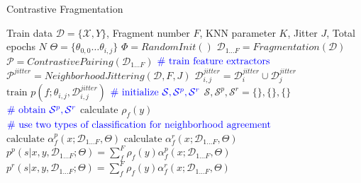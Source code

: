 \documentclass{article}
\theoremstyle{plain}
\theoremstyle{definition}
\theoremstyle{remark}
\begin{document}
    

\begin{algorithm}[tb]
\caption{Contrastive Fragmentation}\label{alg:fragmented_selection}
    \begin{algorithmic}
         Train data $\mathcal{D} = \{\mathcal{X}, Y\}$, Fragment number $F$, KNN parameter $K$, Jitter $J$, Total epochs $N$ 
        \STATE
        \STATE $\Theta = \{\theta_{0,0} \ldots \theta_{i,j}\}$ 
        \STATE $\Phi = RandomInit()$ 
        \STATE
        \STATE $\mathcal{D}_{1 \ldots F} = Fragmentation(\mathcal{D})$ 
        \STATE $\mathcal{P} = ContrastivePairing(\mathcal{D}_{1 \ldots F})$ 
            \STATE $\text{\color{blue}{\# train feature extractors}}$
            \STATE $\mathcal{P}^{jitter} = NeighborhoodJittering(\mathcal{D}, F, J)$ 
                \STATE $\mathcal{D}_{i,j}^{jitter} = \mathcal{D}_i^{jitter} \cup \mathcal{D}_j^{jitter}$
                \STATE $\text{train } p(f; \theta_{i,j},\mathcal{D}_{i,j}^{jitter})$ %
            \ENDFOR
            \STATE
            \STATE $\color{blue}{\text{\# initialize } \mathcal{S}, \mathcal{S}^p, \mathcal{S}^r}$
            \STATE $\mathcal{S}, \mathcal{S}^p, \mathcal{S}^r = \{\}, \{\}, \{\}$ 
            \STATE
            \STATE $\color{blue}{\text{\# obtain } \mathcal{S}^p, \mathcal{S}^r}$
                    \STATE $\text{calculate }\rho^\text{}_f(y)$ 
                    \STATE $\text{\color{blue}{\# use two types of classification for neighborhood agreement}}$
                    \STATE $\text{calculate }\alpha_f^p(x; \mathcal{D}_{1 \ldots F}, \Theta)$ 
                    \STATE $\text{calculate }\alpha_f^r(x; \mathcal{D}_{1 \ldots F}, \Theta)$ 
                \ENDFOR
                \STATE $p^p(s|x,y, \mathcal{D}_{1 \ldots F};\Theta) = \sum_{f}^{F} \rho^\text{}_f(y)\alpha_f^p(x; \mathcal{D}_{1 \ldots F}, \Theta)$ 
                \STATE $p^r(s|x,y, \mathcal{D}_{1 \ldots F};\Theta) = \sum_{f}^{F} \rho^\text{}_f(y)\alpha_f^r(x; \mathcal{D}_{1 \ldots F}, \Theta)$ 


\end{algorithmic}
\end{algorithm}
\end{document}
